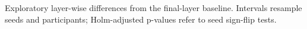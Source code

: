 \begin{table}[tbp]
  \centering
  \small
  \caption{Exploratory layer-wise differences from the final-layer baseline.
  Intervals resample seeds and participants; Holm-adjusted p-values refer to
  seed sign-flip tests.}
  \label{tab:layerwise}
  
\end{table}



